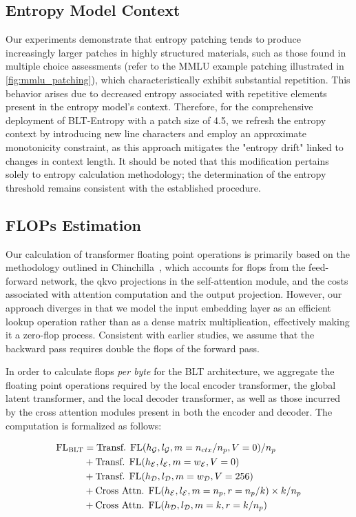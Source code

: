 \subsection{Entropy Model Context}
\label{section:entropy-context}
Our experiments demonstrate that entropy patching tends to produce increasingly larger patches in highly structured materials, such as those found in multiple choice assessments (refer to the MMLU example patching illustrated in \autoref{fig:mmlu_patching}), which characteristically exhibit substantial repetition. This behavior arises due to decreased entropy associated with repetitive elements present in the entropy model's context. Therefore, for the comprehensive deployment of {\textsc BLT}-Entropy with a patch size of 4.5, we refresh the entropy context by introducing new line characters and employ an approximate monotonicity constraint, as this approach mitigates the "entropy drift" linked to changes in context length. It should be noted that this modification pertains solely to entropy calculation methodology; the determination of the entropy threshold remains consistent with the established procedure.

\subsection{FLOPs Estimation} 
\label{section:flops}

Our calculation of transformer floating point operations is primarily based on the methodology outlined in Chinchilla~\citep{hoffmann2022training}, which accounts for flops from the feed-forward network, the qkvo projections in the self-attention module, and the costs associated with attention computation and the output projection. However, our approach diverges in that we model the input embedding layer as an efficient lookup operation rather than as a dense matrix multiplication, effectively making it a zero-flop process. Consistent with earlier studies, we assume that the backward pass requires double the flops of the forward pass.

In order to calculate flops \textit{per byte} for the {\textsc BLT} architecture, we aggregate the floating point operations required by the local encoder transformer, the global latent transformer, and the local decoder transformer, as well as those incurred by the cross attention modules present in both the encoder and decoder. The computation is formalized as follows:

\begin{align}
    \text{FL}_{\text{{\textsc BLT}}} &= \text{Transf. FL}(h_{\mathcal{G}}, l_{\mathcal{G}}, m=n_{ctx}/n_p, V=0) / n_p\\
   &+ \text{Transf. FL}(h_{\mathcal{E}}, l_{\mathcal{E}}, m=w_{\mathcal{E}}, V=0) \\
   &+ \text{Transf. FL}(h_{\mathcal{D}}, l_{\mathcal{D}}, m=w_{\mathcal{D}}, V=256) \\ 
    &+ \text{Cross Attn. FL}(h_{\mathcal{E}}, l_{\mathcal{E}}, m=n_p, r=n_p/k) \times k / n_p \\ 
   &+ \text{Cross Attn. FL}(h_{\mathcal{D}}, l_{\mathcal{D}}, m=k, r=k/n_p) 
\end{align}

